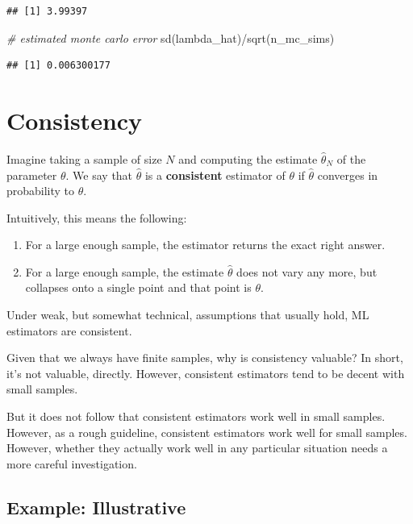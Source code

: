 \documentclass[
]{book}
\newenvironment{Shaded}{\begin{snugshade}}{\end{snugshade}}
\newcommand{\CommentTok}[1]{\textcolor[rgb]{0.56,0.35,0.01}{\textit{#1}}}
\newcommand{\FunctionTok}[1]{\textcolor[rgb]{0.00,0.00,0.00}{#1}}
\newcommand{\NormalTok}[1]{#1}
\newcommand{\SpecialCharTok}[1]{\textcolor[rgb]{0.00,0.00,0.00}{#1}}
\providecommand{\tightlist}{%
  \setlength{\itemsep}{0pt}\setlength{\parskip}{0pt}}
\begin{document}
\begin{verbatim}
## [1] 3.99397
\end{verbatim}

\begin{Shaded}
\begin{Highlighting}[]
\CommentTok{\# estimated monte carlo error}
\FunctionTok{sd}\NormalTok{(lambda\_hat)}\SpecialCharTok{/}\FunctionTok{sqrt}\NormalTok{(n\_mc\_sims)}
\end{Highlighting}
\end{Shaded}

\begin{verbatim}
## [1] 0.006300177
\end{verbatim}

\hypertarget{consistency}{%
\section{Consistency}\label{consistency}}

Imagine taking a sample of size \(N\) and computing the estimate \(\hat{\theta}_N\) of the parameter \(\theta\). We say that \(\hat{\theta}\) is a \textbf{consistent} estimator of \(\theta\) if \(\hat{\theta}\) converges in probability to \(\theta\).

Intuitively, this means the following:

\begin{enumerate}
\def\labelenumi{\arabic{enumi}.}
\tightlist
\item
  For a large enough sample, the estimator returns the exact right answer.
\item
  For a large enough sample, the estimate \(\hat{\theta}\) does not vary any more, but collapses onto a single point and that point is \(\theta\).
\end{enumerate}

Under weak, but somewhat technical, assumptions that usually hold, ML estimators are consistent.

Given that we always have finite samples, why is consistency valuable? In short, it's not valuable, directly. However, consistent estimators tend to be decent with small samples.

But it does not follow that consistent estimators work well in small samples. However, as a rough guideline, consistent estimators work well for small samples. However, whether they actually work well in any particular situation needs a more careful investigation.

\hypertarget{example-illustrative}{%
\subsection{Example: Illustrative}\label{example-illustrative}}
\end{document}
